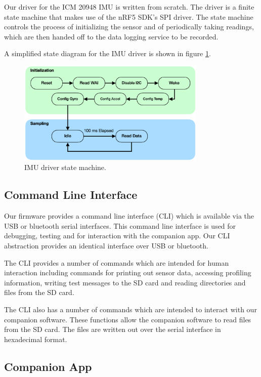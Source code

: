 Our driver for the ICM 20948 IMU is written from scratch. The driver is a finite
state machine that makes use of the nRF5 SDK's SPI driver. The state machine
controls the process of initializing the sensor and of periodically taking
readings, which are then handed off to the data logging service to be recorded.

A simplified state diagram for the IMU driver is shown in figure
\ref{fig:fw_imu_fsm}.

\begin{figure}[!htb]
\centering
\includegraphics[width=0.8\textwidth]{images/fw_imu_fsm.png}
\caption{IMU driver state machine.}
\label{fig:fw_imu_fsm}
\end{figure}

\subsection{Command Line Interface}

Our firmware provides a command line interface (CLI) which is available via the
USB or bluetooth serial interfaces. This command line interface is used for
debugging, testing and for interaction with the companion app. Our CLI
abstraction provides an identical interface over USB or bluetooth.

The CLI provides a number of commands which are intended for human interaction
including commands for printing out sensor data, accessing profiling information,
writing test messages to the SD card and reading directories and files from the
SD card.

The CLI also has a number of commands which are intended to interact with our
companion software. These functions allow the companion software to read files
from the SD card. The files are written out over the serial interface in
hexadecimal format.

\subsection{Companion App}


